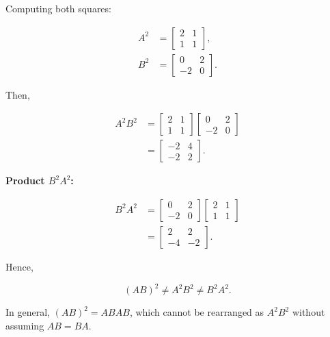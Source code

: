 \begin{answer}
    Computing both squares:

    $$
    \begin{aligned}
        A^2 &= \begin{bmatrix}
            2 & 1 \\
            1 & 1
        \end{bmatrix}, \\[1em]
        B^2 &= \begin{bmatrix}
            0 & 2 \\
            -2 & 0
        \end{bmatrix}.
    \end{aligned}
    $$

    Then,

    $$
    \begin{aligned}
        A^2B^2
        &= \begin{bmatrix}
            2 & 1 \\
            1 & 1
        \end{bmatrix}
        \begin{bmatrix}
            0 & 2 \\
            -2 & 0
        \end{bmatrix} \\[0.5em]
        &= \boxed{\begin{bmatrix}
            -2 & 4 \\
            -2 & 2
        \end{bmatrix}}.
    \end{aligned}
    $$

    \textbf{Product $B^2A^2$:}

    $$
    \begin{aligned}
        B^2A^2
        &= \begin{bmatrix}
            0 & 2 \\
            -2 & 0
        \end{bmatrix}
        \begin{bmatrix}
            2 & 1 \\
            1 & 1
        \end{bmatrix} \\[0.5em]
        &= \boxed{\begin{bmatrix}
            2 & 2 \\
            -4 & -2
        \end{bmatrix}}.
    \end{aligned}
    $$

    Hence,

    $$
    \boxed{
        (AB)^2 \neq A^2B^2 \neq B^2A^2
    }.
    $$

    In general, $(AB)^2 = ABAB$, which
    cannot be rearranged as $A^2B^2$
    without assuming $AB=BA$.
\end{answer}
